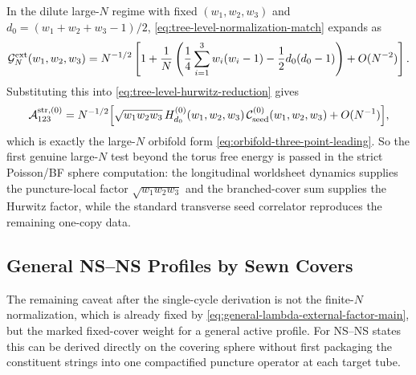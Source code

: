 \documentclass[11pt]{article}
\newcommand{\mc}[1]{\mathcal{#1}}
\begin{document}
In the dilute large-$N$ regime with fixed $(w_1,w_2,w_3)$ and $d_0=(w_1+w_2+w_3-1)/2$, \eqref{eq:tree-level-normalization-match} expands as
\begin{equation}\label{eq:tree-level-large-n-prefactor}
\mc G_N^{\rm ext}(w_1,w_2,w_3)
=
N^{-1/2}
\left[
1+\frac{1}{N}
\left(
\frac14\sum_{i=1}^3 w_i(w_i-1)-\frac12 d_0(d_0-1)
\right)
+O(N^{-2})
\right].
\end{equation}
Substituting this into \eqref{eq:tree-level-hurwitz-reduction} gives
\begin{equation}\label{eq:tree-level-large-n-match}
\mc A^{\rm str,(0)}_{123}
=
N^{-1/2}
\Big[
\sqrt{w_1w_2w_3}\,
H_{d_0}^{(0)}(w_1,w_2,w_3)\,
\mc C_{\mathrm{seed}}^{(0)}(w_1,w_2,w_3)
+O(N^{-1})
\Big],
\end{equation}
which is exactly the large-$N$ orbifold form \eqref{eq:orbifold-three-point-leading}. So the first genuine large-$N$ test beyond the torus free energy is passed in the strict Poisson/BF sphere computation: the longitudinal worldsheet dynamics supplies the puncture-local factor $\sqrt{w_1w_2w_3}$ and the branched-cover sum supplies the Hurwitz factor, while the standard transverse seed correlator reproduces the remaining one-copy data.

\subsection{General NS--NS Profiles by Sewn Covers}

The remaining caveat after the single-cycle derivation is not the finite-$N$ normalization, which is already fixed by \eqref{eq:general-lambda-external-factor-main}, but the marked fixed-cover weight for a general active profile. For NS--NS states this can be derived directly on the covering sphere without first packaging the constituent strings into one compactified puncture operator at each target tube.
\end{document}
